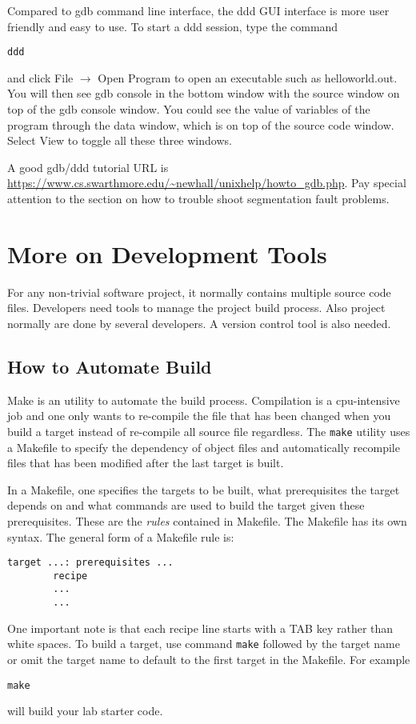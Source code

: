 Compared to gdb command line interface, the ddd GUI interface is more user friendly and easy to use. To start a ddd session,
type the command
\begin{lstlisting}[style=bash]
ddd 
\end{lstlisting}
and click File $\rightarrow$ Open Program to open an executable such as helloworld.out. You will then see gdb console in the bottom window with the source window on top of the gdb console window. You could see the value of variables of the program through the data window, which is on top of the source code window. Select View to toggle all these three windows. 

A good gdb/ddd tutorial URL is \url{https://www.cs.swarthmore.edu/~newhall/unixhelp/howto_gdb.php}. Pay special attention to the section on how to trouble shoot segmentation fault problems.
\section{More on Development Tools}

For any non-trivial software project, it normally contains multiple source code files. Developers need tools to manage the project build process. Also project normally are done by several developers. A version control tool is also needed.

\subsection{How to Automate Build}

Make is an utility to automate the build process. Compilation is a cpu-intensive job and one only wants to re-compile the file that has been changed when you build a target instead of re-compile all source file regardless. 
The \verb+make+ utility uses a Makefile to specify the dependency of object files and automatically recompile files that has been modified after the last target is built. 

In a Makefile, one specifies the targets to be built, what prerequisites the target depends on and what commands are used to build the target given these prerequisites. These are the {\em rules} contained in Makefile. The Makefile has its own syntax.
The general form of a Makefile rule is:
\begin{lstlisting}[style=makefile]
target ...: prerequisites ... 
        recipe
        ...	
        ...	
\end{lstlisting}
One important note is that each recipe line starts with a TAB key rather than white spaces. To build a target, use command \verb+make+ followed by the target name or omit the target name to default to the first target in the Makefile. For example
\begin{lstlisting}[style=bash]
make
\end{lstlisting}
will build your lab starter code.

